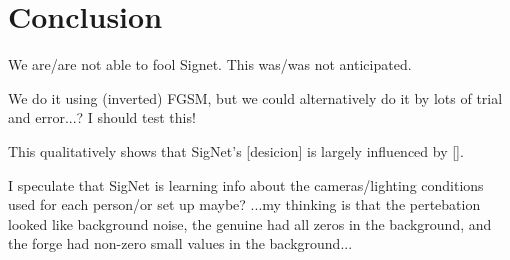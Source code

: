 \section{Conclusion}\label{sec:conclusion}

We are/are not able to fool Signet.
This was/was not anticipated.

We do it using (inverted) FGSM, but we could alternatively do it by lots of trial and error...?
    I should test this!

This qualitatively shows that SigNet's [desicion] is largely influenced by [].


I speculate that SigNet is learning info about the cameras/lighting conditions used for each person/or set up maybe?
...my thinking is that the pertebation looked like background noise, the genuine had all zeros in the background, and the forge had non-zero small values in the background...
